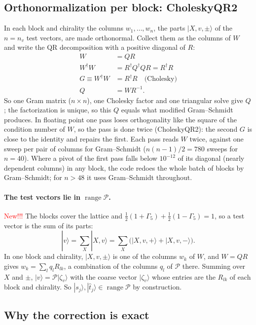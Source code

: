 \documentclass[11pt,a4paper]{article}
\numberwithin{equation}{section}
\newcommand{\dg}{^{\dagger}}
\newcommand{\Gfive}{\Gamma_5}
\newcommand{\Pro}{\mathcal P}
\begin{document}
\subsection{Orthonormalization per block: CholeskyQR2}
\label{sec:cholqr}
In each block and chirality the columns $w_1,\dots,w_n$, the parts $|X,v,\pm\rangle$ of the
$n=n_v$ test vectors, are made orthonormal. Collect them as the columns of $W$ and write the QR
decomposition with a positive diagonal of $R$:
\begin{align}
W&=QR\nonumber\\
W\dg W&=R\dg Q\dg QR=R\dg R\nonumber\\
G\equiv W\dg W&=R\dg R\quad\text{(Cholesky)}\nonumber\\
Q&=WR^{-1} .
\end{align}
So one Gram matrix ($n\times n$), one Cholesky factor and one triangular solve give $Q$; the
factorization is unique, so this $Q$ equals what modified Gram--Schmidt produces. In floating
point one pass loses orthogonality like the square of the condition number of $W$, so the pass
is done twice (CholeskyQR2): the second $G$ is close to the identity and repairs the first. Each
pass reads $W$ twice, against one sweep per pair of columns for Gram--Schmidt ($n(n-1)/2=780$
sweeps for $n=40$). Where a pivot of the first pass falls below $10^{-12}$ of its diagonal (nearly
dependent columns) in any block, the code redoes the whole batch of blocks by Gram--Schmidt; for
$n>48$ it uses Gram--Schmidt throughout.

\paragraph{The test vectors lie in $\operatorname{range}\Pro$.} \textcolor{red}{New!!!} The blocks cover the lattice and
$\frac12(1+\Gfive)+\frac12(1-\Gfive)=1$, so a test vector is the sum of its parts:
\begin{equation}
|v\rangle=\sum_X|X,v\rangle=\sum_X\big(|X,v,+\rangle+|X,v,-\rangle\big).
\end{equation}
In one block and chirality, $|X,v,\pm\rangle$ is one of the columns $w_k$ of $W$, and $W=QR$ gives
$w_k=\sum_lq_lR_{lk}$, a combination of the columns $q_l$ of $\Pro$ there. Summing over $X$ and
$\pm$, $|v\rangle=\Pro|\zeta_v\rangle$ with the coarse vector $|\zeta_v\rangle$ whose entries are the
$R_{lk}$ of each block and chirality. So $|s_j\rangle,|\hat t_j\rangle\in\operatorname{range}\Pro$
by construction.

\subsection{Why the correction is exact}
\label{sec:exact}
\end{document}

